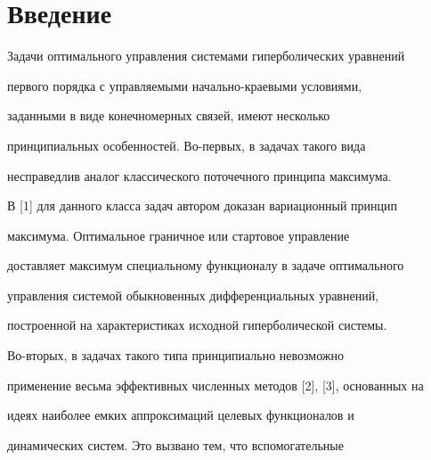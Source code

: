\date{}




\pagestyle{plain} %







\maketitle


\label{begin}








\section*{Введение}








Задачи оптимального управления системами гиперболических уравнений


первого порядка с управляемыми начально-краевыми условиями,


заданными в виде конечномерных связей, имеют несколько


принципиальных особенностей. Во-первых, в задачах такого вида


несправедлив  аналог классического поточечного принципа максимума.


В [1] для данного класса задач автором доказан вариационный принцип


максимума. Оптимальное граничное или стартовое управление


доставляет максимум специальному функционалу в задаче оптимального


управления системой обыкновенных дифференциальных уравнений,


построенной на характеристиках исходной гиперболической системы.


Во-вторых, в задачах такого типа принципиально невозможно


применение весьма эффективных численных методов [2], [3], основанных на


идеях наиболее емких аппроксимаций целевых функционалов и


динамических систем. Это вызвано тем, что вспомогательные


